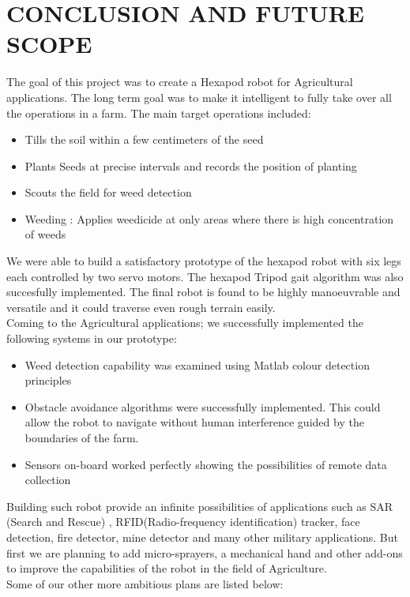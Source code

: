 \documentclass{report}
\begin{document}
\chapter{CONCLUSION AND FUTURE SCOPE}
The goal of this project was to create a Hexapod robot for Agricultural applications. The long term goal was to make it intelligent to fully take over all the operations in a farm. The main target operations included:\\
\begin{itemize}
\item Tills the soil within a few centimeters of the seed
\item	Plants Seeds at precise intervals and records the position of planting
\item	Scouts the field for weed detection
\item	Weeding : Applies weedicide at only areas where there is high concentration of weeds
\end{itemize}
We were able to build a satisfactory prototype of the hexapod robot with six legs each controlled by two servo motors. The hexapod Tripod gait algorithm was also succesfully implemented.
The final robot is found to be highly manoeuvrable and versatile and it could traverse even rough terrain easily.\\
Coming to the Agricultural applications; we successfully implemented the following systems in our prototype:
\begin{itemize}
\item Weed detection capability was examined using Matlab colour detection principles
\item Obstacle avoidance algorithms were successfully implemented. This could allow the robot to navigate without human interference guided by the boundaries of the farm.
\item Sensors on-board worked perfectly showing the possibilities of remote data collection 
\end{itemize}
Building such robot provide an infinite possibilities of applications such as SAR (Search and Rescue) ,
RFID(Radio-frequency identification) tracker, face detection, fire detector, mine detector and many other military applications. But first we are planning to add micro-sprayers, a mechanical hand and other add-ons to improve the capabilities of the robot in the field of Agriculture.\\
Some of our other more ambitious plans are listed below:
\end{document}
